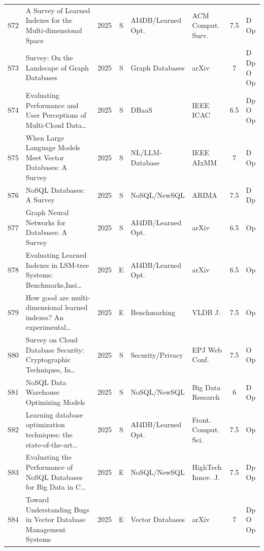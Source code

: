 \documentclass[a4paper,fleqn]{cas-sc}
\begin{document}
\begin{landscape}
\begin{longtable}{c p{3.5cm} c c p{2.45cm} p{2.3cm} c p{1.5cm}}
S72 & A Survey of Learned Indexes for the Multi-dimensional Space~\cite{AbdullahAlMamun2025AI4DB} & 2025 & S & AI4DB/Learned Opt. & ACM Comput. Surv. & 7.5 & D Op \\
\addlinespace
S73 & Survey: On the Landscape of Graph Databases~\cite{Coimbra2025GraphDB} & 2025 & S & Graph Databases & arXiv & 7 & D Dp O Op \\
\addlinespace
S74 & Evaluating Performance and User Perceptions of Multi-Cloud Data\ldots{}~\cite{Daundasekara2025MultiCloud} & 2025 & S & DBaaS & IEEE ICAC & 6.5 & Dp O Op \\
\addlinespace
S75 & When Large Language Models Meet Vector Databases: A Survey~\cite{Jing2025NLIDB} & 2025 & S & NL/LLM-Database & IEEE AIxMM & 7 & D Op \\
\addlinespace
S76 & NoSQL Databases: A Survey~\cite{Kaur2021NoSQLReview} & 2025 & S & NoSQL/NewSQL & ARIMA & 7.5 & D Dp \\
\addlinespace
S77 & Graph Neural Networks for Databases: A Survey~\cite{Li2025AI4DB} & 2025 & S & AI4DB/Learned Opt. & arXiv & 6.5 & Op \\
\addlinespace
S78 & Evaluating Learned Indexes in LSM-tree Systems: Benchmarks,Insi\ldots{}~\cite{Liu2025AI4DB} & 2025 & E & AI4DB/Learned Opt. & arXiv & 6.5 & Op \\
\addlinespace
S79 & How good are multi-dimensional learned indexes? An experimental\ldots{}~\cite{Liu2025Bench} & 2025 & E & Benchmarking & VLDB J. & 7.5 & Op \\
\addlinespace
S80 & Survey on Cloud Database Security: Cryptographic Techniques, In\ldots{}~\cite{Mahule2025Sec} & 2025 & S & Security/Privacy & EPJ Web Conf. & 7.5 & O Op \\
\addlinespace
S81 & NoSQL Data Warehouse Optimizing Models~\cite{Mouhibha2025NoSQLDW} & 2025 & S & NoSQL/NewSQL & Big Data Research & 6 & D Op \\
\addlinespace
S82 & Learning database optimization techniques: the state-of-the-art\ldots{}~\cite{Qiao2025AI4DB} & 2025 & S & AI4DB/Learned Opt. & Front. Comput. Sci. & 7.5 & Op \\
\addlinespace
S83 & Evaluating the Performance of NoSQL Databases for Big Data in C\ldots{}~\cite{Topcu2025NoSQL} & 2025 & E & NoSQL/NewSQL & HighTech Innov. J. & 7.5 & Dp Op \\
\addlinespace
S84 & Toward Understanding Bugs in Vector Database Management Systems~\cite{Xie2025VectorDB} & 2025 & E & Vector Databases & arXiv & 7 & Dp O Op \\
\end{longtable}\endgroup
\end{landscape}




\end{document}
